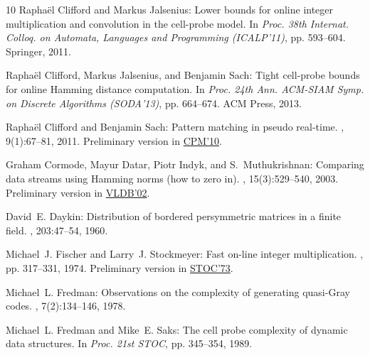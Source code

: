 \documentclass[11pt]{article}
\numberwithin{equation}{section}
\theoremstyle{definition}
\theoremstyle{plain}
\begin{document}
\begin{thebibliography}{10}
{\sc Rapha\"{e}l Clifford and Markus Jalsenius}: Lower bounds for online
  integer multiplication and convolution in the cell-probe model.
\newblock In {\em Proc. 38th Internat. Colloq. on Automata, Languages and
  Programming (ICALP'11)}, pp. 593--604. Springer, 2011.

{\sc Rapha\"{e}l Clifford, Markus Jalsenius, and Benjamin Sach}: Tight
  cell-probe bounds for online {H}amming distance computation.
\newblock In {\em Proc. 24th Ann. ACM-SIAM Symp. on Discrete Algorithms
  (SODA'13)}, pp. 664--674. ACM Press, 2013.

{\sc Rapha{\"e}l Clifford and Benjamin Sach}: Pattern matching in pseudo
  real-time.
, 9(1):67--81, 2011.
\newblock Preliminary version in
  \href{https://doi.org/10.1007/978-3-642-13509-5\_10}{CPM'10}.

{\sc Graham Cormode, Mayur Datar, Piotr Indyk, and S.~Muthukrishnan}: Comparing
  data streams using {H}amming norms (how to zero in).
, 15(3):529--540, 2003.
\newblock Preliminary version in
  \href{http://www.vldb.org/conf/2002/S10P02.pdf}{VLDB'02}.

{\sc David~E. Daykin}: Distribution of bordered persymmetric matrices in a
  finite field.
, 203:47--54, 1960.

{\sc Michael~J. Fischer and Larry~J. Stockmeyer}: Fast on-line integer
  multiplication.
, pp. 317--331, 1974.
\newblock Preliminary version in
  \href{https://doi.org/10.1145/800125.804037}{STOC'73}.
\newblock [\epfmtdoi{10.1016/S0022-0000(74)80047-4}]

{\sc Michael~L. Fredman}: Observations on the complexity of generating
  quasi-{G}ray codes.
, 7(2):134--146, 1978.
\newblock [\epfmtdoi{10.1137/0207012}]

{\sc Michael~L. Fredman and Mike~E. Saks}: The cell probe complexity of dynamic
  data structures.
\newblock In {\em Proc. 21st STOC}, pp. 345--354, 1989.
\newblock [\epfmtdoi{10.1145/73007.73040}]


\end{thebibliography}
\end{document}
